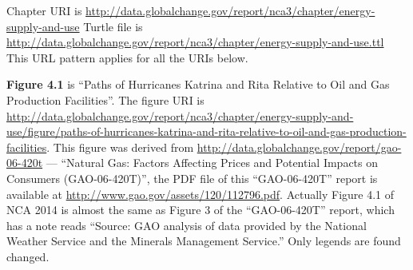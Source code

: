Chapter URI is \url{http://data.globalchange.gov/report/nca3/chapter/energy-supply-and-use}
Turtle file is \url{http://data.globalchange.gov/report/nca3/chapter/energy-supply-and-use.ttl}
This URL pattern applies for all the URIs below.

\textbf{Figure 4.1} is ``Paths of Hurricanes Katrina and Rita Relative to Oil and Gas Production Facilities''. The
figure URI is \url{http://data.globalchange.gov/report/nca3/chapter/energy-supply-and-use/figure/paths-of-hurricanes-katrina-and-rita-relative-to-oil-and-gas-production-facilities}.
This figure was derived from \url{http://data.globalchange.gov/report/gao-06-420t} --- ``Natural Gas: Factors Affecting Prices and Potential Impacts on Consumers (GAO-06-420T)'', the 
PDF file of this ``GAO-06-420T'' report is available at \url{http://www.gao.gov/assets/120/112796.pdf}.
Actually Figure 4.1 of NCA 2014 is almost the same as Figure 3 of the ``GAO-06-420T'' report, which has a note reads ``Source: GAO analysis of data provided by the National Weather Service and the Minerals Management Service.''
Only legends are found changed.

